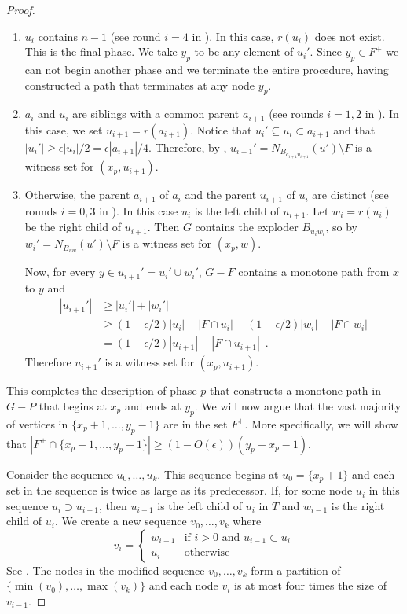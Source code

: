 \documentclass{patmorin}
\begin{document}
\begin{proof}
\begin{enumerate}
    \item $u_i$ contains $n-1$ (see round $i=4$ in ).  
    In this case, $r(u_i)$ does not exist.
    This is the final phase.  We take $y_p$ to be any element of $u_i'$.
    Since $y_p\in F^+$ we can not begin another phase and we terminate
    the entire procedure, having constructed a path that terminates at
    any node $y_p$.

    \item $a_i$ and $u_i$ are siblings with a common
    parent $a_{i+1}$ (see rounds $i=1,2$ in ).
    In this case, we set $u_{i+1}=r(a_{i+1})$.
    Notice that $u_i'\subseteq u_{i}\subset a_{i+1}$ and that
    $|u_i'|\ge \epsilon|u_i|/2 = \epsilon|a_{i+1}|/4$.  Therefore, by
    , $u_{i+1}'= N_{B_{a_{i+1}u_{i+1}}}(u')\setminus F$
    is a witness set for $(x_p,u_{i+1})$.

   \item Otherwise, the parent $a_{i+1}$ of $a_i$ and the parent $u_{i+1}$
   of $u_i$ are distinct (see rounds $i=0,3$ in ).
   In this case $u_i$ is the left child of $u_{i+1}$.  Let $w_i=r(u_i)$
   be the right child of $u_{i+1}$.  Then $G$ contains the exploder
   $B_{u_iw_i}$, so by  $w_i'=N_{B_{uw}}(u')\setminus F$
   is a witness set for $(x_p,w)$.

   Now, for every $y\in u_{i+1}'=u_i'\cup w_i'$, $G-F$ contains a monotone
   path from $x$ to $y$ and
   \begin{align*}
     |u_{i+1}'| 
     & \ge |u_i'|+|w_i'| \\
     & \ge (1-\epsilon/2)|u_{i}| - |F\cap u_i| + (1-\epsilon/2)|w_i| - |F\cap w_i| \\
     &= (1-\epsilon/2)|u_{i+1}| - |F\cap u_{i+1}|  \enspace .
   \end{align*}
  Therefore $u_{i+1}'$ is a witness set for $(x_p,u_{i+1})$.
  \end{enumerate}

  This completes the description of phase $p$ that constructs a
  monotone path in $G-P$ that begins at $x_p$
  and ends at $y_p$.  We will now argue that the vast majority of
  vertices in $\{x_p+1,\ldots,y_p-1\}$ are in the set $F^+$.  More
  specifically, we will show that $|F^+\cap\{x_p+1,\ldots,y_p-1\}| \ge
  (1-O(\epsilon))(y_p-x_p-1)$.

  Consider the sequence $u_0,\ldots,u_k$.  This sequence begins at
  $u_0=\{x_p+1\}$ and each set in the sequence is twice as large as its
  predecessor.   If, for some node $u_i$ in this sequence $u_i\supset
  u_{i-1}$, then $u_{i-1}$ is the left child of $u_i$ in $T$ and
  $w_{i-1}$ is the right child of $u_i$.    We create a new sequence
  $v_0,\ldots,v_k$ where
  \[
    v_i = \begin{cases} 
      w_{i-1} & \text{if $i>0$ and $u_{i-1}\subset u_i$} \\
      u_i & \text{otherwise}
    \end{cases}
  \]
  See .
  The nodes in the modified sequence $v_0,\ldots,v_k$ form a partition
  of $\{\min(v_0),\ldots,\max(v_k)\}$ and each node $v_i$ is at most
  four times the size of $v_{i-1}$.


\end{proof}
\end{document}
